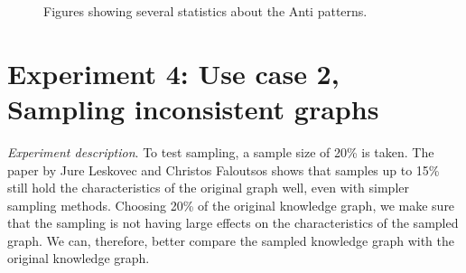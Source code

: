 \documentclass[11pt,letterpaper ,oneside ]{book}
\begin{document}
	
\begin{figure}[ht]
	\centering
	\caption{Figures showing several statistics about the Anti patterns.}
	\label{fig:AntipatternStats}
\end{figure}

	\section{Experiment 4: Use case 2, Sampling inconsistent graphs} 
	\textit{Experiment description}. To test sampling, a sample size of 20\% is taken. The paper by Jure Leskovec and Christos Faloutsos \cite{Leskovec:2006} shows that samples up to 15\% still hold the characteristics of the original graph well, even with simpler sampling methods. Choosing 20\% of the original knowledge graph, we make sure that the sampling is not having large effects on the characteristics of the sampled graph. We can, therefore, better compare the sampled knowledge graph with the original knowledge graph. \\
	
\end{document}
